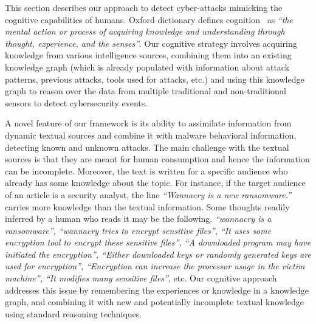 \label{sec:ccs}
This section describes our approach to detect cyber-attacks mimicking the cognitive capabilities of humans. Oxford dictionary defines cognition~\cite{cognition_oxford} as \textit{``the mental action or process of acquiring knowledge and understanding through thought, experience, and the senses''}. Our cognitive strategy involves acquiring knowledge from various intelligence sources, combining them into an existing knowledge graph (which is already populated with information about attack patterns, previous attacks, tools used for attacks, etc.) and using this knowledge graph to reason over the data from multiple traditional and non-traditional sensors to detect cybersecurity events. 

A novel feature of our framework is its ability to assimilate information from dynamic textual sources and combine it with malware behavioral information, detecting known and unknown attacks. The main challenge with the textual sources is that they are meant for human consumption and hence the information can be incomplete. Moreover, the text is written for a specific audience who already has some knowledge about the topic. For instance, if the target audience of an article is a security analyst, the line \textit{``Wannacry is a new ransomware.''} carries more knowledge than the textual information. Some thoughts readily inferred by a human who reads it may be the following. \textit{``wannacry is a ransomware'',  ``wannacry tries to encrypt sensitive files'', ``It uses some encryption tool to encrypt these sensitive files'', ``A downloaded program may have initiated the encryption'', ``Either downloaded keys or randomly generated keys are used for encryption'', ``Encryption can increase the processor usage in the victim machine'', ``It modifies many sensitive files''}, etc. Our cognitive approach addresses this issue by remembering the experiences or knowledge in a knowledge graph, and combining it with new and potentially incomplete textual knowledge using standard reasoning techniques. 

